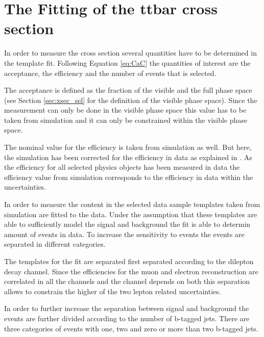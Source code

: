 \chapter{The Fitting of the ttbar cross section}

\label{sec:xsec_fit}

In order to measure the cross section several quantities have to be determined in the template fit. Following Equation \ref{eq:CaC} the quantities of interest are the 
acceptance, the efficiency and the number of \ttbar events that is selected. 

The acceptance is defined as the fraction of the visible and the full phase space (see Section \ref{sec:xsec_sel} for the definition of the visible phase space).
Since the measurement can only be done in the visible phase space this value has to be taken from simulation and it can only be constrained within the visible phase space.

The nominal value for the efficiency is taken from simulation as well.  But here, the simulation has been corrected for the efficiency in data as explained in . 
As the efficiency for all selected physics objects has been measured in data the efficiency value from simulation corresponds to the efficiency in data within the uncertainties.

In order to measure the \ttbar content in the selected data sample templates taken from simulation are fitted to the data. Under the assumption that these templates are able to sufficiently 
model the signal and background the fit is able to determin amount of \ttbar events in data.
To increase the sensitivity to \ttbar events the events are separated in different categories.

The templates for the fit are separated first separated according to the dilepton decay channel. Since the efficiencies for the muon and electron reconstruction are correlated in all the channels and the \emu channel depends on both this separation allows to constrain the higher of the two lepton related uncertainties.

In order to further increase the separation between signal and background the events are further divided according to the number of b-tagged jets.
There are three categories of events with one, two and zero or more than two b-tagged jets.

